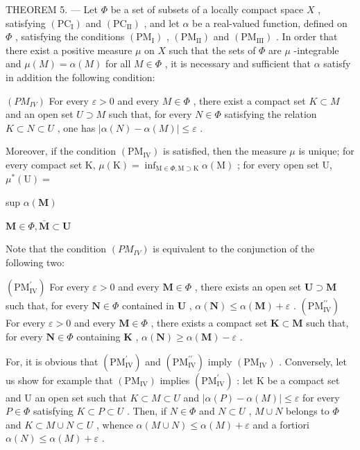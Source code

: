 THEOREM 5. --- Let \(\Phi\) be a set of subsets of a locally compact space \(X\) , satisfying \((\mathrm{PC}_{\mathrm{I}})\) and \((\mathrm{PC}_{\mathrm{II}})\) , and let \(\alpha\) be a real-valued function, defined on \(\Phi\) , satisfying the conditions \((\mathrm{PM}_{\mathrm{I}})\) , \((\mathrm{PM}_{\mathrm{II}})\) and \((\mathrm{PM}_{\mathrm{III}})\) . In order that there exist a positive measure \(\mu\) on \(X\) such that the sets of \(\Phi\) are \(\mu\) -integrable and \(\mu(M) = \alpha(M)\) for all \(M \in \Phi\) , it is necessary and sufficient that \(\alpha\) satisfy in addition the following condition:

\((PM_{IV})\) For every \(\varepsilon > 0\) and every \(M \in \Phi\) , there exist a compact set \(K \subset M\) and an open set \(U \supset M\) such that, for every \(N \in \Phi\) satisfying the relation \(K \subset N \subset U\) , one has \(|\alpha(N) - \alpha(M)| \leqslant \varepsilon\) .

Moreover, if the condition \((\mathrm{PM}_{\mathrm{IV}})\) is satisfied, then the measure \(\mu\) is unique; for every compact set K, \(\mu(\mathrm{K}) = \inf_{\mathrm{M} \in \Phi, \mathrm{M} \supset \mathrm{K}} \alpha(\mathrm{M})\) ; for every open set U, \(\mu^{*}(\mathrm{U}) =\)

sup \(\alpha (\mathbf{M})\)

\(\mathbf{M}\in \Phi ,\bar{\mathbf{M}}\subset \mathbf{U}\)

Note that the condition \((PM_{IV})\) is equivalent to the conjunction of the following two:

\((\mathrm{PM}_{\mathrm{IV}}^{\prime})\) For every \(\varepsilon > 0\) and every \(\mathbf{M} \in \Phi\) , there exists an open set \(\mathbf{U} \supset \mathbf{M}\) such that, for every \(\mathbf{N} \in \Phi\) contained in \(\mathbf{U}\) , \(\alpha(\mathbf{N}) \leqslant \alpha(\mathbf{M}) + \varepsilon\) . \((\mathrm{PM}_{\mathrm{IV}}^{\prime \prime})\) For every \(\varepsilon > 0\) and every \(\mathbf{M} \in \Phi\) , there exists a compact set \(\mathbf{K} \subset \mathbf{M}\) such that, for every \(\mathbf{N} \in \Phi\) containing \(\mathbf{K}\) , \(\alpha(\mathbf{N}) \geqslant \alpha(\mathbf{M}) - \varepsilon\) .

For, it is obvious that \((\mathrm{PM}_{\mathrm{IV}}^{\prime})\) and \((\mathrm{PM}_{\mathrm{IV}}^{\prime\prime})\) imply \((\mathrm{PM}_{\mathrm{IV}})\) . Conversely, let us show for example that \((\mathrm{PM}_{\mathrm{IV}})\) implies \((\mathrm{PM}_{\mathrm{IV}}^{\prime})\) : let K be a compact set and U an open set such that \(K \subset M \subset U\) and \(|\alpha(P) - \alpha(M)| \leqslant \varepsilon\) for every \(P \in \Phi\) satisfying \(K \subset P \subset U\) . Then, if \(N \in \Phi\) and \(N \subset U\) , \(M \cup N\) belongs to \(\Phi\) and \(K \subset M \cup N \subset U\) , whence \(\alpha(M \cup N) \leqslant \alpha(M) + \varepsilon\) and a fortiori \(\alpha(N) \leqslant \alpha(M) + \varepsilon\) .

